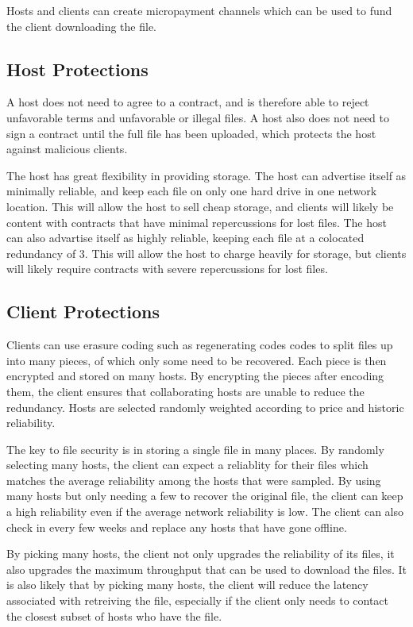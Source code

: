 \documentclass[twocolumn]{article}
\begin{document}
Hosts and clients can create micropayment channels which can be used to fund the client downloading the file.

\subsection{Host Protections}
A host does not need to agree to a contract, and is therefore able to reject unfavorable terms and unfavorable or illegal files.
A host also does not need to sign a contract until the full file has been uploaded, which protects the host against malicious clients.

The host has great flexibility in providing storage.
The host can advertise itself as minimally reliable, and keep each file on only one hard drive in one network location.
This will allow the host to sell cheap storage, and clients will likely be content with contracts that have minimal repercussions for lost files.
The host can also advartise itself as highly reliable, keeping each file at a colocated redundancy of 3.
This will allow the host to charge heavily for storage, but clients will likely require contracts with severe repercussions for lost files.

\subsection{Client Protections}
Clients can use erasure coding such as regenerating codes \cite{reg} codes to split files up into many pieces, of which only some need to be recovered.
Each piece is then encrypted and stored on many hosts.
By encrypting the pieces after encoding them, the client ensures that collaborating hosts are unable to reduce the redundancy.
Hosts are selected randomly weighted according to price and historic reliability.

The key to file security is in storing a single file in many places.
By randomly selecting many hosts, the client can expect a reliablity for their files which matches the average reliability among the hosts that were sampled.
By using many hosts but only needing a few to recover the original file, the client can keep a high reliability even if the average network reliability is low.
The client can also check in every few weeks and replace any hosts that have gone offline.

By picking many hosts, the client not only upgrades the reliability of its files, it also upgrades the maximum throughput that can be used to download the files.
It is also likely that by picking many hosts, the client will reduce the latency associated with retreiving the file, especially if the client only needs to contact the closest subset of hosts who have the file.
\end{document}
